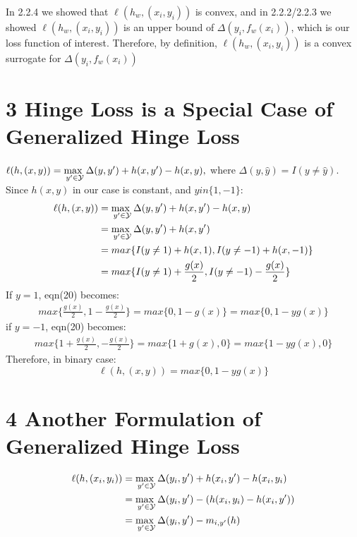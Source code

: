 \documentclass{article}
\newenvironment{sub}[2][$-$]{\begin{trivlist}
		\item[\hskip \labelsep {\bfseries #1}\hskip \labelsep {\bfseries #2.}]}  {\end{trivlist}}
\begin{document}
\begin{sub}{2.3.5}
\end{sub}
In 2.2.4 we showed that $\ell(h_w,(x_i,y_i))$ is convex, and in 2.2.2/2.2.3 we showed  $\ell(h_w,(x_i,y_i))$ is an upper bound of $\Delta(y_i,f_w(x_i))$, which is our loss function of interest. Therefore, by definition, $\ell(h_w,(x_i,y_i))$ is a convex surrogate for $\Delta(y_i,f_w(x_i))$ 

\section{3 Hinge Loss is a Special Case of Generalized Hinge Loss}
$\ell(h,(x,y)) =  \underset{y' \in \mathcal{Y}}{\operatorname{max \hspace{0.05 in}}}  \Delta(y,y')   +h(x,y') - h(x,y),$ where $\Delta(y,\hat{y}) = I(y \neq \hat{y})$.\\
Since $h(x,y)$ in our case is constant, and $y in \{1,-1\}$:
\begin{align}
\ell(h,(x,y)) &=  \underset{y' \in \mathcal{Y}}{\operatorname{max \hspace{0.05 in}}}  \Delta(y,y')   +h(x,y') - h(x,y) \\&= \underset{y' \in \mathcal{Y}}{\operatorname{max \hspace{0.05 in}}}  \Delta(y,y')   +h(x,y')\\
&= max\{I(y\neq 1) + h(x,1), I(y\neq -1)+ h(x,-1) \}\\
& = max\{I(y\neq 1) + \frac{g(x)}{2}, I(y\neq -1)-\frac{g(x)}{2} \}
\end{align}
If $y = 1$, eqn(20) becomes: 
\begin{align}
max\{  \frac{g(x)}{2}, 1 -\frac{g(x)}{2} \} = max\{0,1-g(x)\} = max\{0, 1-yg(x)\}
\end{align}
if $y = -1$, eqn(20) becomes:
\begin{align}
max\{ 1+ \frac{g(x)}{2},  -\frac{g(x)}{2} \} = max\{1+g(x),0\} = max\{ 1-yg(x),0\}
\end{align}
Therefore, in binary case:
$$\ell(h,(x,y))  = max\{ 0, 1-yg(x)\}$$

\section{4 Another Formulation of Generalized Hinge Loss}
\begin{sub}{4.1}
\end{sub}
\begin{align}
\ell(h,(x_i,y_i)) &=  \underset{y' \in \mathcal{Y}}{\operatorname{max \hspace{0.05 in}}}  \Delta(y_i,y')   +h(x_i,y') - h(x_i,y_i)\\
&= \underset{y' \in \mathcal{Y}}{\operatorname{max \hspace{0.05 in}}}  \Delta(y_i,y')   - ( h(x_i,y_i) -h(x_i,y'))\\
&= \underset{y' \in \mathcal{Y}}{\operatorname{max \hspace{0.05 in}}}  \Delta(y_i,y')   - m_{i,y'}(h)
\end{align}
\end{document}
